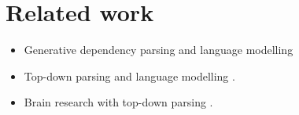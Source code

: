 \section{Related work}
\begin{itemize}
  \item Generative dependency parsing and language modelling \citep{titov2007generative,buys2015bayesian,buys2015generative,buys2018exact}
  \item Top-down parsing and language modelling \citep{roark2001probabilistic}.
  \item Brain research with top-down parsing \citep{brennan2016abstract,hale2018beam}.
\end{itemize}
